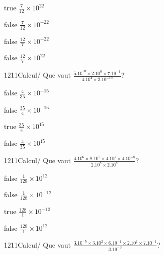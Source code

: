 \documentclass[11pt]{article}
\begin{document}
            \begin{reponses}
                \item[true] $\frac{7}{12}\times 10^{22}$
                \item[false] $\frac{7}{12}\times 10^{-22}$
                \item[false] $\frac{12}{7}\times 10^{-22}$
                \item[false] $\frac{12}{7}\times 10^{22}$
            \end{reponses}
            
            \begin{question}{1211}{Calcul}{}{/}
                Que vaut $\frac{5.10^{10}\times 2.10^{0}\times 7.10^{-1}}{4.10^{4}\times 2.10^{-10}}$?
            \end{question}
            
            \begin{reponses}
                \item[false] $\frac{4}{35}\times 10^{-15}$
                \item[false] $\frac{35}{4}\times 10^{-15}$
                \item[true] $\frac{35}{4}\times 10^{15}$
                \item[false] $\frac{4}{35}\times 10^{15}$
            \end{reponses}
            
            \begin{question}{1211}{Calcul}{}{/}
                Que vaut $\frac{4.10^{6}\times 8.10^{5}\times 4.10^{1}\times 4.10^{-8}}{2.10^{8}\times 2.10^{8}}$?
            \end{question}
            
            \begin{reponses}
                \item[false] $\frac{1}{128}\times 10^{12}$
                \item[false] $\frac{1}{128}\times 10^{-12}$
                \item[true] $\frac{128}{1}\times 10^{-12}$
                \item[false] $\frac{128}{1}\times 10^{12}$
            \end{reponses}
            
            \begin{question}{1211}{Calcul}{}{/}
                Que vaut $\frac{3.10^{-5}\times 3.10^{2}\times 6.10^{-1}\times 2.10^{1}\times 7.10^{-1}}{3.10^{-9}}$?
            \end{question}
            
\end{document}
